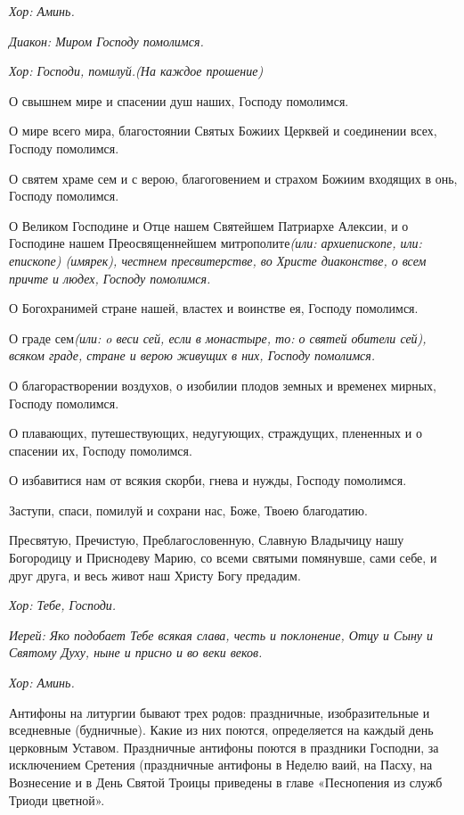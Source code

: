 \itshape Хор:\normalfont{} Аминь.




\itshape Диакон:\normalfont{} Миром Господу помолимся. 


\itshape Хор:\normalfont{} Господи, помилуй.\itshape  (На каждое прошение)\normalfont{}


О свышнем мире и спасении душ наших, Господу помолимся. 


О мире всего мира, благостоянии Святых Божиих Церквей и соединении всех, Господу помолимся.


О святем храме сем и с верою, благоговением и страхом Божиим входящих в онь, Господу помолимся. 


О Великом Господине и Отце нашем Святейшем Патриархе Алексии, и о Господине нашем Преосвященнейшем митрополите\itshape  (или:\normalfont{} архиепископе\itshape , или:\normalfont{} епископе\itshape ) (имярек)\normalfont{}, честнем пресвитерстве, во Христе диаконстве, о всем причте и людех, Господу помолимся. 


О Богохранимей стране нашей, властех и воинстве ея, Господу помолимся.


О граде сем\itshape  (или:\normalfont{} o веси сей\itshape , если в монастыре, то: о\normalfont{} святей обители сей), всяком граде, стране и верою живущих в них, Господу помолимся. 


О благорастворении воздухов, о изобилии плодов земных и временех мирных, Господу помолимся.


О плавающих, путешествующих, недугующих, страждущих, плененных и о спасении их, Господу помолимся. 


О избавитися нам от всякия скорби, гнева и нужды, Господу помолимся. 


Заступи, спаси, помилуй и сохрани нас, Боже, Твоею благодатию. 


Пресвятую, Пречистую, Преблагословенную, Славную Владычицу нашу Богородицу и Приснодеву Марию, со всеми святыми помянувше, сами себе, и друг друга, и весь живот наш Христу Богу предадим. 


\itshape Хор:\normalfont{} Тебе, Господи. 


\itshape Иерей:\normalfont{} Яко подобает Тебе всякая слава, честь и поклонение, Отцу и Сыну и Святому Духу, ныне и присно и во веки веков. 


\itshape Хор:\normalfont{} Аминь.




Антифоны на литургии бывают трех родов: праздничные, изобразительные и вседневные (будничные). Какие из них поются, определяется на каждый день церковным Уставом. Праздничные антифоны поются в праздники Господни, за исключением Сретения (праздничные антифоны в Неделю ваий, на Пасху, на Вознесение и в День Святой Троицы приведены в главе «Песнопения из служб Триоди цветной».


